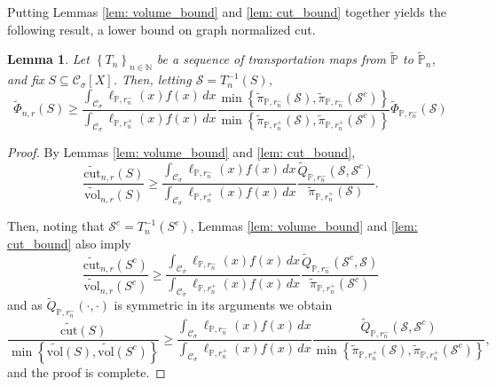 \documentclass[11pt,twoside]{article}
\newtheorem{lemma}{Lemma}
\newcommand{\set}[1]{\left\{#1\right\}}
\newcommand{\seq}[1]{\left\{#1\right\}_{n \in \mathbb{N}}}
\newcommand{\vol}{\mathrm{vol}}
\newcommand{\cut}{\mathrm{cut}}
\newcommand{\1}{\mathbf{1}}
\newcommand{\Xbf}{X}             %
\newcommand{\Pbb}{\mathbb{P}}
\newcommand{\Sset}{\mathcal{S}}
\newcommand{\Cset}{\mathcal{C}}
\newcommand{\Csig}{\Cset_{\sigma}}
\newcommand{\dx}{\,dx}
\newcommand{\piwt}{\widetilde{\pi}}
\begin{document}
Putting Lemmas \ref{lem: volume_bound} and \ref{lem: cut_bound} together yields the following result, a lower bound on graph normalized cut.

\begin{lemma}
	\label{lem: graph_to_continuous_conductance}
	Let $\seq{T_n}$ be a sequence of transportation maps from $\widetilde{\Pbb}$ to $\widetilde{\Pbb}_n$, and fix $S \subseteq \Csig[\Xbf]$. Then, letting $\Sset =T_n^{-1}(S)$,
	\begin{equation}
	\label{eqn: graph_to_continuous_conductance}
	\widetilde{\Phi}_{n,r}(S) \geq \frac{\int_{\Csig} \ell_{\Pbb,r_n^-}(x) f(x) \dx}{\int_{\Csig} \ell_{\Pbb,r_n^+}(x) f(x) \dx}  \frac{\min \set{\piwt_{\Pbb,r_n^-}(\Sset), \piwt_{\Pbb,r_n^-}(\Sset^c)} }{\min \set{\piwt_{\Pbb,r_n^+}(\Sset), \piwt_{\Pbb,r_n^+}(\Sset^c)} } \widetilde{\Phi}_{\Pbb,r_n^{-}}(\Sset)
	\end{equation}
\end{lemma}

\begin{proof}
	
	By Lemmas \ref{lem: volume_bound} and \ref{lem: cut_bound},
	\begin{equation*}
	\frac{\widetilde{\cut}_{n,r}(S)}{\widetilde{\vol}_{n,r}(S)} \geq \frac{\int_{\Csig} \ell_{\Pbb,r_n^-}(x) f(x) \dx}{\int_{\Csig} \ell_{\Pbb,r_n^+}(x) f(x) \dx} \frac{\widetilde{Q}_{\Pbb,r_n^-}(\Sset, \Sset^c)}{\piwt_{\Pbb,r_n^+}(\Sset)}.
	\end{equation*}
	
	Then, noting that $\Sset^c = T_n^{-1}(S^c)$, Lemmas \ref{lem: volume_bound} and \ref{lem: cut_bound} also imply
	\begin{equation*}
	\frac{\widetilde{\cut}_{n,r}(S^c)}{\widetilde{\vol}_{n,r}(S^c)} \geq \frac{\int_{\Csig} \ell_{\Pbb,r_n^-}(x) f(x) \dx}{\int_{\Csig} \ell_{\Pbb,r_n^+}(x) f(x) \dx} \frac{\widetilde{Q}_{\Pbb,r_n^-}(\Sset^c, \Sset)}{\piwt_{\Pbb,r_n^+}(\Sset^c)}
	\end{equation*}
	and as $\widetilde{Q}_{\Pbb,r_n^-}(\cdot, \cdot)$ is symmetric in its arguments we obtain
	\begin{equation*}
	\frac{\widetilde{\cut}(S)}{\min\set{\widetilde{\vol}(S), \widetilde{\vol}(S^c)}} \geq \frac{\int_{\Csig} \ell_{\Pbb,r_n^-}(x) f(x) \dx}{\int_{\Csig} \ell_{\Pbb,r_n^+}(x) f(x) \dx} \frac{\widetilde{Q}_{\Pbb,r_n^-}(\Sset, \Sset^c)}{\min \set{\piwt_{\Pbb,r_n^+}(\Sset), \piwt_{\Pbb,r_n^+}(\Sset^c)} },
	\end{equation*}
	and the proof is complete.
\end{proof}
\end{document}
